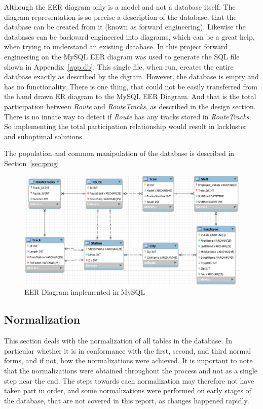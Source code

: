 Although the EER diagram only is a model and not a database itself. The diagram 
representation is so precise a description of the database, that the database 
can be created from it (known as forward engineering). Likewise the databases 
can be backward engineered into diagrams, which can be a great help, when 
trying to understand an existing database. In this project forward engineering 
on the MySQL EER diagram was used to generate the SQL file shown in 
Appendix~\ref{app:db}. This single file, when run, creates the entire database 
exactly as described by the digram. However, the database is empty and has no 
functionality. There is one thing, that could not be easily transferred from the hand drawn ER diagram to the MySQL EER Diagram. And that is the total participation between \emph{Route} and \emph{RouteTracks}, as described in the design section. There is no innate way to detect if \emph{Route} has any tracks stored in \emph{RouteTracks}. So implementing the total participation relationship would result in lackluster and suboptimal solutions.

The population and common manipulation of the database is 
described in Section~\ref{sec:prog}

\begin{figure}
    \centering
    \includegraphics[width=\textwidth]{img/EER.png}
    \caption{EER Diagram implemented in MySQL}
    \label{fig:EER}
\end{figure}

\subsection{Normalization}
This section deals with the normalization of all tables in the database. In 
particular whether it is in conformance with the first, second, and third 
normal forms, and if not, how the normalizations were achieved. It is important 
to note that the normalizations were obtained throughout the process and not as 
a single step near the end. The steps towards each normalization may therefore 
not have taken part in order, and some normalizations were performed on early 
stages of the database, that are not covered in this report, as changes 
happened rapidly. 

